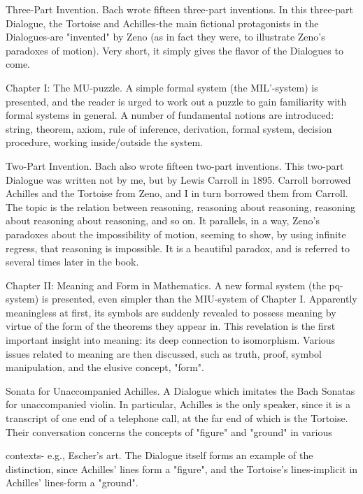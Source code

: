 Three-Part Invention. Bach wrote fifteen three-part inventions. In this three-part Dialogue, the
   Tortoise and Achilles-the main fictional protagonists in the Dialogues-are "invented" by Zeno (as
   in fact they were, to illustrate Zeno's paradoxes of motion). Very short, it simply gives the flavor
   of the Dialogues to come.

Chapter I: The MU-puzzle. A simple formal system (the MIL'-system) is presented, and the reader
  is urged to work out a puzzle to gain familiarity with formal systems in general. A number of
  fundamental notions are introduced: string, theorem, axiom, rule of inference, derivation, formal
  system, decision procedure, working inside/outside the system.

Two-Part Invention. Bach also wrote fifteen two-part inventions. This two-part Dialogue was written
  not by me, but by Lewis Carroll in 1895. Carroll borrowed Achilles and the Tortoise from Zeno,
  and I in turn borrowed them from Carroll. The topic is the relation between reasoning, reasoning
  about reasoning, reasoning about reasoning about reasoning, and so on. It parallels, in a way,
  Zeno's paradoxes about the impossibility of motion, seeming to show, by using infinite regress,
  that reasoning is impossible. It is a beautiful paradox, and is referred to several times later in the
  book.

Chapter II: Meaning and Form in Mathematics. A new formal system (the pq-system) is
  presented, even simpler than the MIU-system of Chapter I. Apparently meaningless at first, its
  symbols are suddenly revealed to possess meaning by virtue of the form of the theorems they
  appear in. This revelation is the first important insight into meaning: its deep connection to
  isomorphism. Various issues related to meaning are then discussed, such as truth, proof, symbol
  manipulation, and the elusive concept, "form".

Sonata for Unaccompanied Achilles. A Dialogue which imitates the Bach Sonatas for
   unaccompanied violin. In particular, Achilles is the only speaker, since it is a transcript of one
   end of a telephone call, at the far end of which is the Tortoise. Their conversation concerns the
   concepts of "figure" and "ground" in various





   contexts- e.g., Escher's art. The Dialogue itself forms an example of the distinction, since
   Achilles' lines form a "figure", and the Tortoise's lines-implicit in Achilles' lines-form a "ground".

